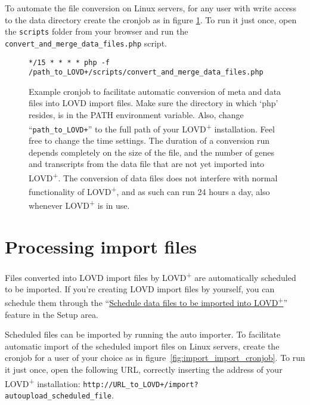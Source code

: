 To automate the file conversion on Linux servers,
 for any user with write access to the data directory create the cronjob as in figure \ref{fig:import_tsv_cronjob}.
To run it just once, open the \texttt{scripts} folder from your browser and run the
 \texttt{convert\_and\_merge\_data\_files.php} script.

\begin{figure}[ht]
  \begin{shaded}
\begin{verbatim}
*/15 * * * * php -f /path_to_LOVD+/scripts/convert_and_merge_data_files.php
\end{verbatim}
  \caption{%
    Example cronjob to facilitate automatic conversion of meta and data files into LOVD import files.
    Make sure the directory in which `php' resides, is in the PATH environment variable.
    Also, change ``\texttt{path\_to\_LOVD+}'' to the full path of your LOVD\textsuperscript{+} installation.
    Feel free to change the time settings.
    The duration of a conversion run depends completely on the size of the file,
     and the number of genes and transcripts from the data file that are not yet imported into LOVD\textsuperscript{+}.
    The conversion of data files does not interfere with normal functionality of LOVD\textsuperscript{+},
     and as such can run 24 hours a day, also whenever LOVD\textsuperscript{+} is in use.}
    \label{fig:import_tsv_cronjob}
  \end{shaded}
\end{figure}





\section{Processing import files}
\label{sec:import_import}
Files converted into LOVD import files by LOVD\textsuperscript{+} are automatically scheduled to be imported.
If you're creating LOVD import files by yourself, you can schedule them through the
 ``\hyperref[sec:import_monitoring]{Schedule data files to be imported into LOVD\textsuperscript{+}}''
 feature in the Setup area.

Scheduled files can be imported by running the auto importer.
To facilitate automatic import of the scheduled import files on Linux servers,
 create the cronjob for a user of your choice as in figure~\ref{fig:import_import_cronjob}.
To run it just once, open the following URL, correctly inserting the address of your LOVD\textsuperscript{+}
 installation: \texttt{http://URL\_to\_LOVD+/import?autoupload\_scheduled\_file}.

